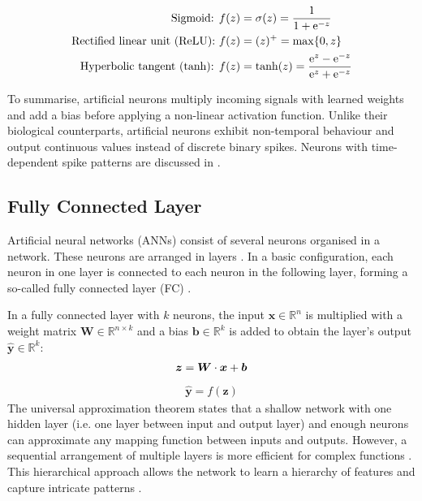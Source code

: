 %
\begin{align}\eqlbl{act_functions}%
		\text{Sigmoid: } & f(z) = \sigma(z) = \frac{1}{1+\mathrm{e}^{-z}}\\
		\text{Rectified linear unit (ReLU): } & f(z) = (z)^{+} = \max\{0, z\}\\
		\text{Hyperbolic tangent (tanh): }  & f(z) = \tanh(z) = \frac{\mathrm{e}^{z}-\mathrm{e}^{-z}}{\mathrm{e}^{z}+\mathrm{e}^{-z}}
\end{align}


To summarise, artificial neurons multiply incoming signals with learned weights and add a bias before applying a non-linear activation function.
Unlike their biological counterparts, artificial neurons exhibit non-temporal behaviour and output continuous values instead of discrete binary spikes. Neurons with time-dependent spike patterns are discussed in .

\subsection{Fully Connected Layer}
Artificial neural networks (ANNs) consist of several neurons organised in a network. These neurons are arranged in layers \cite{prince_understanding_2023}. In a basic configuration, each neuron in one layer is connected to each neuron in the following layer, forming a so-called fully connected layer (FC) .

In a fully connected layer with $k$ neurons, the input $\boldsymbol{x} \in \mathbb{R}^n$ is multiplied with a weight matrix $\boldsymbol{W} \in \mathbb{R}^{n\times k}$ and a bias $\boldsymbol{b} \in \mathbb{R}^k$ is added to obtain the layer's output $\boldsymbol{\hat{y}} \in \mathbb{R}^k$:
\begin{align}\eqlbl{nn3}%
	\boldsymbol{z} = \boldsymbol{W} \cdot \boldsymbol{x} + \boldsymbol{b}
\end{align}
\begin{align}
	\hat{\boldsymbol{y}} = f(\boldsymbol{z})
\end{align}
%
The universal approximation theorem  states that a shallow network with one hidden layer (i.e. one layer between input and output layer) and enough neurons can approximate any mapping function between inputs and outputs.
However, a sequential arrangement of multiple layers is more efficient for complex functions . This hierarchical approach allows the network to learn a hierarchy of features and capture intricate patterns .

